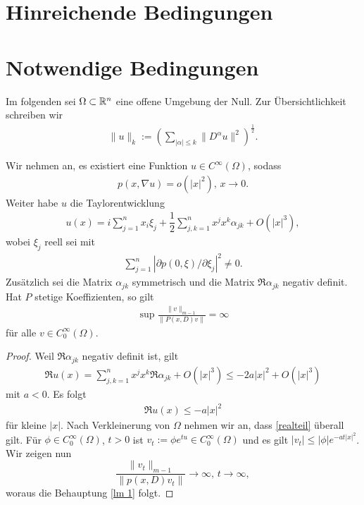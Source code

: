 \section{Hinreichende Bedingungen}
\cite{Hormander:1955}


\section{Notwendige Bedingungen}
Im folgenden sei $\Omega \subset \mathbb R^n$ eine offene Umgebung der Null. Zur Übersichtlichkeit schreiben wir
\begin{align*}
\lVert u \rVert_k := \left( \sum_{|\alpha| \le k} \lVert D^\alpha u \rVert^2 \right)^{\frac{1}{2}}.
\end{align*}
\begin{lem}
Wir nehmen an, es existiert eine Funktion $u \in C^\infty (\Omega)$, sodass 
\begin{align}
p(x, \nabla u) = o \left(|x|^2\right), \, x \rightarrow 0.
\end{align}
Weiter habe $u$ die Taylorentwicklung \begin{align}
u(x) = i \sum_{j=1}^{n} x_i \xi_j + \dfrac{1}{2} \sum_{j,k=1}^{n} x^j x^k \alpha_{jk} + O\left( |x|^3 \right),
\end{align}
wobei $\xi_j$ reell sei mit 
\begin{align}
\sum_{j=1}^{n}|\partial p(0,\xi)/\partial \xi_j|^2 \neq 0.
\end{align}
Zusätzlich sei die Matrix $\alpha_{jk}$ symmetrisch und die Matrix $\Re \alpha_{jk}$ negativ definit. Hat $P$ stetige Koeffizienten, so gilt
\begin{align}
\label{lm 1}
\sup \frac{ \lVert v \rVert_{m-1} }{ \lVert P(x,D)v \rVert} = \infty
\end{align}
für alle $v \in C_0^\infty(\Omega)$.
\end{lem}
\begin{proof}
Weil $\Re \alpha_{jk}$ negativ definit ist, gilt\begin{align*}
\Re u(x) = \sum_{j,k=1}^{n} x^jx^k \Re \alpha_{jk} + O\left( |x|^3 \right) \le -2a |x|^2 + O\left( |x|^3 \right)
\end{align*}
mit $a<0$. Es folgt
\begin{align}
\label{realteil}
\Re u(x) \le -a |x|^2
\end{align}
für kleine $|x|$. Nach Verkleinerung von $\Omega$ nehmen wir an, dass \ref{realteil} überall gilt. Für $\phi \in C_0^\infty(\Omega)$, $t>0$ ist $v_t := \phi e^{tu} \in C_0^\infty(\Omega)$ und es gilt $|v_t| \le |\phi| e^{-at|x|^2}$. Wir zeigen nun
\[
\frac{\lVert v_t \rVert_{m-1}}{\lVert p(x,D)v_t \rVert} \rightarrow \infty, \, t \rightarrow \infty,
\]
woraus die Behauptung \ref{lm 1} folgt.
\end{proof}
